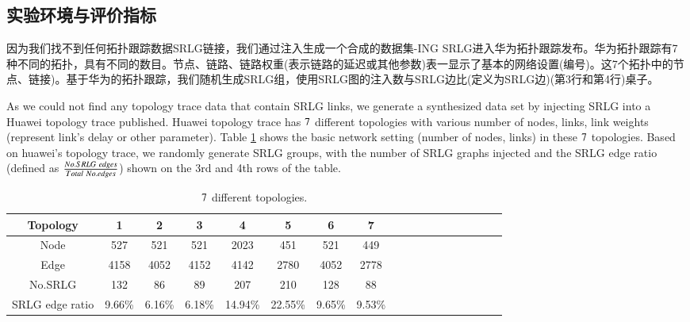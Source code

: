 
\subsection{实验环境与评价指标}

因为我们找不到任何拓扑跟踪数据SRLG链接，我们通过注入生成一个合成的数据集-ING SRLG进入华为拓扑跟踪发布。华为拓扑跟踪有7种不同的拓扑，具有不同的数目。节点、链路、链路权重(表示链路的延迟或其他参数)表一显示了基本的网络设置(编号)。这7个拓扑中的节点、链接)。基于华为的拓扑跟踪，我们随机生成SRLG组，使用SRLG图的注入数与SRLG边比(定义为SRLG边)(第3行和第4行)桌子。


As we could not find any topology trace data that contain SRLG links, we generate a synthesized data  set by injecting SRLG into a Huawei topology trace published. Huawei topology trace has $7$ different topologies with various number of nodes, links, link weights (represent link's delay or other parameter). Table \ref{tab:AllSample} shows the basic network setting (number of nodes, links) in these $7$ topologies. Based on huawei's topology trace, we randomly generate SRLG groups, with the number of SRLG graphs injected and the SRLG edge ratio (defined as $\frac{{No.SRLG \  {\rm{ }}edges}}{{Total \  {\rm{ }}No.edges}}$) shown on the 3rd and 4th rows of the table.







\begin{table}[tp]
\caption{$7$ different topologies.}
  \centering
\footnotesize{  \begin{tabular}{*{18}{c}}
\toprule
Topology & 1 & 2 & 3 & 4 & 5 & 6& 7   \\
\midrule
Node    &     527&      521    &      521     &    2023             &     451     &     521     &     449       \\
Edge   &    4158 &  4052     &    4152      &   4142          &       2780   &      4052   &      2778    \\
No.SRLG & 132 &  86   &  89  &  207        & 210  &  128  &   88    \\
SRLG edge ratio & 9.66\% & 6.16\% &   6.18\% &   14.94\%    &   22.55\%  &  9.65\% &   9.53\%     \\
\bottomrule
\end{tabular}
}

\label{tab:AllSample}
\end{table}

